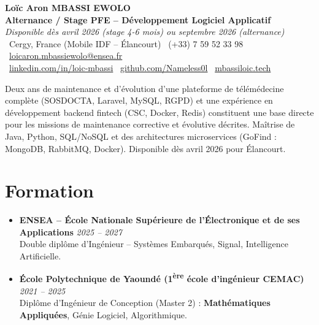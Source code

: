 \documentclass[a4paper,11pt]{article}
\begin{document}
\begin{center}
    {\Large \textbf{Loïc Aron MBASSI EWOLO}} \\ \vspace{4pt}
    \textbf{\large Alternance / Stage PFE -- Développement Logiciel Applicatif} \\
    \textit{\small Disponible dès avril 2026 (stage 4-6 mois) ou septembre 2026 (alternance)} \\ \vspace{4pt}
    \small
    \faMapMarker\ Cergy, France (Mobile IDF -- Élancourt) \quad
    \faPhone\ (+33) 7 59 52 33 98 \quad
    \faEnvelope\ \href{mailto:loicaron.mbassiewolo@ensea.fr}{loicaron.mbassiewolo@ensea.fr} \\ \vspace{2pt}
    \faLinkedin\ \href{https://www.linkedin.com/in/loic-mbassi/}{linkedin.com/in/loic-mbassi} \quad
    \faGithub\ \href{https://github.com/Nameless0l}{github.com/Nameless0l} \quad
    \faGlobe\ \href{https://mbassiloic.tech}{mbassiloic.tech}
\end{center}

\vspace{-6pt}

\noindent\small{Deux ans de maintenance et d'évolution d'une plateforme de télémédecine complète (SOSDOCTA, Laravel, MySQL, RGPD) et une expérience en développement backend fintech (CSC, Docker, Redis) constituent une base directe pour les missions de maintenance corrective et évolutive décrites. Maîtrise de Java, Python, SQL/NoSQL et des architectures microservices (GoFind : MongoDB, RabbitMQ, Docker). Disponible dès avril 2026 pour Élancourt.}

\section{Formation}
\begin{itemize}[leftmargin=*, label=\tiny$\bullet$, nosep]
    \item \textbf{ENSEA -- École Nationale Supérieure de l'Électronique et de ses Applications} \hfill \textit{2025 -- 2027} \\
    \small{Double diplôme d'Ingénieur -- Systèmes Embarqués, Signal, Intelligence Artificielle.}
    \item \textbf{École Polytechnique de Yaoundé (1\textsuperscript{ère} école d'ingénieur CEMAC)} \hfill \textit{2021 -- 2025} \\
    \small{Diplôme d'Ingénieur de Conception (Master 2) : \textbf{Mathématiques Appliquées}, Génie Logiciel, Algorithmique.}
\end{itemize}
\end{document}
